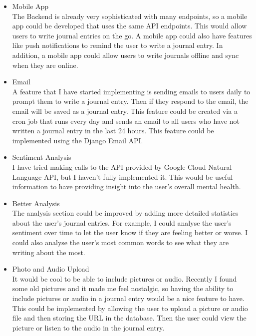 \begin{itemize}
    \item Mobile App \\
    The Backend is already very sophisticated with many endpoints, so a mobile app could be developed that uses the same API endpoints. This would allow users to write journal entries on the go. A mobile app could also have features like push notifications to remind the user to write a journal entry. In addition, a mobile app could allow users to write journals offline and sync when they are online.

    \item Email \\
    A feature that I have started implementing is sending emails to users daily to prompt them to write a journal entry. Then if they respond to the email, the email will be saved as a journal entry. This feature could be created via a cron job that runs every day and sends an email to all users who have not written a journal entry in the last 24 hours. This feature could be implemented using the Django Email API. 

    \item Sentiment Analysis \\
    I have tried making calls to the API provided by Google Cloud Natural Language API, but I haven't fully implemented it. This would be useful information to have providing insight into the user's overall mental health.

    \item Better Analysis \\
    The analysis section could be improved by adding more detailed statistics about the user's journal entries. For example, I could analyse the user's sentiment over time to let the user know if they are feeling better or worse. I could also analyse the user's most common words to see what they are writing about the most. 

    \item Photo and Audio Upload \\
    It would be cool to be able to include pictures or audio. Recently I found some old pictures and it made me feel nostalgic, so having the ability to include pictures or audio in a journal entry would be a nice feature to have. This could be implemented by allowing the user to upload a picture or audio file and then storing the URL in the database. Then the user could view the picture or listen to the audio in the journal entry.
    
\end{itemize}